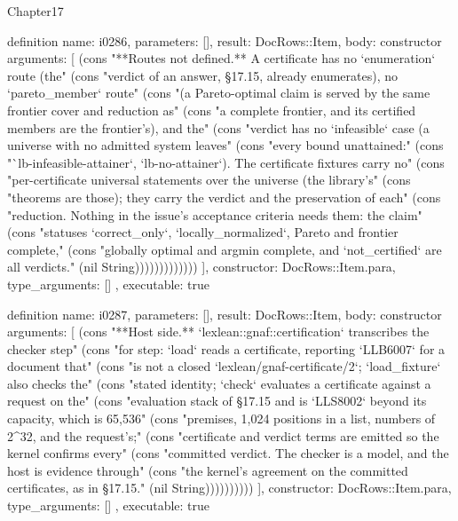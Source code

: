 \begin{lexlean}{Chapter17}
\begin{semanticmodule}
definition{
  name: i0286,
  parameters: [],
  result: DocRows::Item,
  body: constructor{
    arguments: [
      (cons "**Routes not defined.** A certificate has no `enumeration` route (the" (cons "verdict of an answer, §17.15, already enumerates), no `pareto_member` route" (cons "(a Pareto-optimal claim is served by the same frontier cover and reduction as" (cons "a complete frontier, and its certified members are the frontier's), and the" (cons "verdict has no `infeasible` case (a universe with no admitted system leaves" (cons "every bound unattained:" (cons "`lb-infeasible-attainer`, `lb-no-attainer`). The certificate fixtures carry no" (cons "per-certificate universal statements over the universe (the library's" (cons "theorems are those); they carry the verdict and the preservation of each" (cons "reduction. Nothing in the issue's acceptance criteria needs them: the claim" (cons "statuses `correct_only`, `locally_normalized`, Pareto and frontier complete," (cons "globally optimal and argmin complete, and `not_certified` are all verdicts." (nil String)))))))))))))
    ],
    constructor: DocRows::Item.para,
    type_arguments: []
  },
  executable: true
}

definition{
  name: i0287,
  parameters: [],
  result: DocRows::Item,
  body: constructor{
    arguments: [
      (cons "**Host side.** `lexlean::gnaf::certification` transcribes the checker step" (cons "for step: `load` reads a certificate, reporting `LLB6007` for a document that" (cons "is not a closed `lexlean/gnaf-certificate/2`; `load_fixture` also checks the" (cons "stated identity; `check` evaluates a certificate against a request on the" (cons "evaluation stack of §17.15 and is `LLS8002` beyond its capacity, which is 65,536" (cons "premises, 1,024 positions in a list, numbers of 2^32, and the request's;" (cons "certificate and verdict terms are emitted so the kernel confirms every" (cons "committed verdict. The checker is a model, and the host is evidence through" (cons "the kernel's agreement on the committed certificates, as in §17.15." (nil String))))))))))
    ],
    constructor: DocRows::Item.para,
    type_arguments: []
  },
  executable: true
}


\end{semanticmodule}
\end{lexlean}

